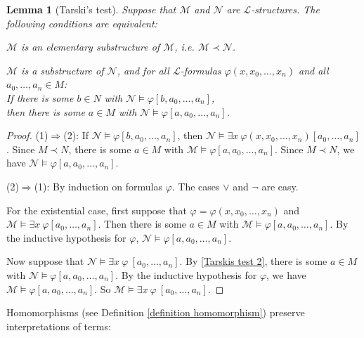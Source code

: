 \documentclass[a4paper, 11pt]{amsart}
\newtheorem{lemma}[lemma]{Lemma}
\theoremstyle{remark}
\newcommand{\cL}{\mathcal L}
\newcommand{\cM}{\mathcal M}
\newcommand{\cN}{\mathcal N}
\newenvironment{enumerate-(1)}{\begin{enumerate}[label={\upshape (\arabic*)}, leftmargin=2pc]}{\end{enumerate}}
\begin{document}
\begin{lemma}[Tarski's test] 
\label{Tarskis test}
Suppose that $\cM$ and $\cN$ are $\cL$-structures. 
The following conditions are equivalent: 
\begin{enumerate-(1)} 
\item 
$\cM$ is an elementary substructure of $\cM$, i.e. $\cM \prec \cN$. 
\item 
\label{Tarskis test 2} 
$\cM$ is a substructure of $\cN$, and  
for all $\cL$-formulas $\varphi(x,x_0,\dots,x_n)$ and all $a_0,\dots,a_n\in M$: \smallskip  \\ 
If there is some $b\in N$ with $\cN\models \varphi[b,a_0,\dots,a_n]$,  \\ 
\indent  \hspace{60pt} then there is some $a\in M$ with $\cN \models \varphi[a,a_0,\dots, a_n]$. 
\end{enumerate-(1)} 
\end{lemma} 
\begin{proof} 
(1)$\Rightarrow$(2): 
If $\cN\models \varphi[b,a_0,\dots,a_n]$, then $\cN\models \exists x\ \varphi(x,x_0,\dots,x_n)[a_0,\dots,a_n]$. 
Since $M\prec N$, there is some $a\in M$ with $\cM\models \varphi[a,a_0,\dots,a_n]$. 
Since $M\prec N$, we have $\cN\models \varphi[a,a_0,\dots,a_n]$. 

(2)$\Rightarrow$(1):  By induction on formulas $\varphi$. 
The cases $\vee$ and $\neg $ are easy. 


For the existential case, first suppose that $\varphi=\varphi(x,x_0,\dots,x_n)$ and $\cM\models \exists x\ \varphi[a_0,\dots,a_n]$. 
Then there is some $a\in M$ with $\cM\models \varphi[a,a_0,\dots,a_n]$. 
By the inductive hypothesis for $\varphi$, $\cN\models \varphi[a,a_0,\dots,a_n]$. 

Now suppose that $\cN\models \exists x\ \varphi\ [a_0,\dots,a_n]$. 
By \ref{Tarskis test 2}, there is some $a\in M$ with $\cN\models \varphi[a,a_0,\dots,a_n]$. 
By the inductive hypothesis for $\varphi$, we have $\cM\models \varphi[a,a_0,\dots,a_n]$. 
So $\cM\models \exists x\ \varphi\ [a_0,\dots,a_n]$. 

\end{proof} 

Homomorphisms (see Definition \ref{definition homomorphism}) preserve interpretations of terms:  
\end{document}
